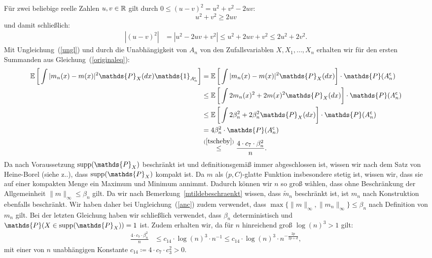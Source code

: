 {Für zwei beliebige reelle Zahlen $u, v \in \mathbb{R}$ gilt durch $0 \leq (u - v)^2 = u^2 + v^2 - 2uv$:
$$u^2 + v^2 \geq 2uv$$ und damit schließlich:
\begin{equation}
\label{ungl}
\begin{split}
|(u - v)^2| & = |u^2 - 2uv + v^2|
\leq  u^2 + 2uv + v^2
\leq 2u^2 + 2v^2.
\end{split}
\end{equation}
Mit Ungleichung~(\ref{ungl}) und durch die Unabhängigkeit von $A_n$ von den Zufallsvariablen $X, X_1, \dots, X_n$ erhalten wir für den ersten Summanden aus Gleichung~(\ref{originaleq}):
\begin{equation}
\label{anc}
\begin{split}
 \E \bigg[\int |m_n(x) - m(x)|^2 \mathds{P}_X(dx) \mathds{1}_{A_n^{\mathsf{c}}}\bigg] & =  \E \bigg[\int |m_n(x) - m(x)|^2 \mathds{P}_X(dx) \bigg] \cdot \mathds{P}(A_n^{\mathsf{c}}) \\
 & \leq \E \bigg[\int 2m_n(x)^2 + 2m(x)^2 \mathds{P}_X(dx)\bigg] \cdot \mathds{P}(A_n^{\mathsf{c}})\\
 & \leq \E \bigg[\int  2\beta_n^2 + 2\beta_n^2 \mathds{P}_X(dx)\bigg] \cdot \mathds{P}(A_n^{\mathsf{c}})\\
 & = 4\beta_n^2 \cdot \mathds{P}(A_n^{\mathsf{c}}) \\
 & \stackrel{(\ref{tscheby})}{\leq} \frac{4 \cdot c_7 \cdot \beta_n^2}{n}.
\end{split}
\end{equation}
Da nach Voraussetzung $\supp(\mathds{P}_X)$ beschränkt ist und definitionsgemäß immer abgeschlossen ist, wissen wir nach dem Satz von Heine-Borel (siehe z.\@B.\@ \cite[Satz 5]{forster2016}), dass $\supp(\mathds{P}_X)$ kompakt ist. Da $m$ als ($p,C$)-glatte Funktion insbesondere stetig ist, wissen wir, dass sie auf einer kompakten Menge ein Maximum und Minimum annimmt. Dadurch können wir $n$ so groß wählen, dass ohne Beschränkung der Allgemeinheit $\|m\|_{\infty} \leq \beta_n$ gilt.
Da wir nach Bemerkung~\ref{mtildebeschraenkt} wissen, dass $\tilde{m}_n$ beschränkt ist, ist $m_n$ nach Konstruktion ebenfalls beschränkt. Wir haben daher bei Ungleichung~(\ref{anc}) zudem verwendet, dass $\max\{\|m\|_{\infty}, \|m_n\|_{\infty}\} \leq \beta_n$ nach Definition von $m_n$ gilt. Bei der letzten Gleichung haben wir schließlich verwendet, dass $\beta_n$ deterministisch und $\mathds{P}(X \in \supp(\mathds{P}_X)) = 1$ ist.
Zudem erhalten wir, da für $n$ hinreichend groß $\log(n)^3 > 1$ gilt:
\begin{equation}
\label{6thsum}
\begin{split}
\frac{4 \cdot c_7 \cdot \beta_n^2}{n} & \leq c_{14} \cdot \log(n)^3 \cdot n^{-1} \leq c_{14} \cdot \log(n)^3 \cdot n^{- \frac{2p}{2p + d}},
\end{split}
\end{equation} 
mit einer von $n$ unabhängigen Konstante $c_{14} \coloneqq 4 \cdot c_7 \cdot c_3^2 > 0$.

}
